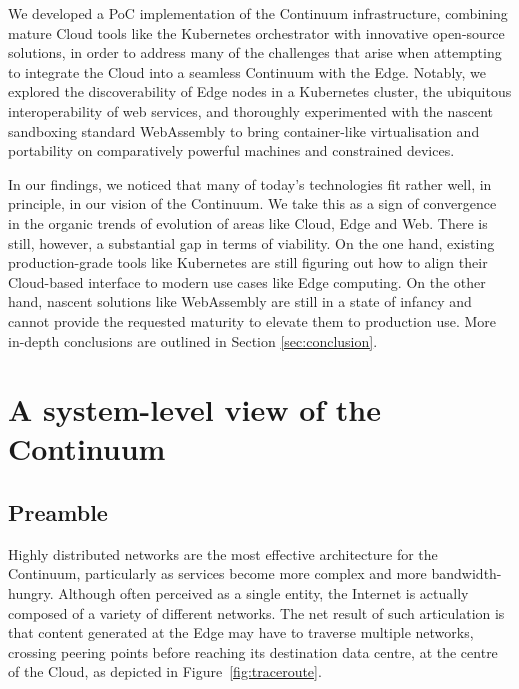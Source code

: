 We developed a PoC implementation of the Continuum infrastructure, combining mature Cloud tools like the Kubernetes \cite{kubernetes} orchestrator with innovative open-source solutions, in order to address many of the challenges that arise when attempting to integrate the Cloud into a seamless Continuum with the Edge. Notably, we explored the discoverability of Edge nodes in a Kubernetes cluster, the ubiquitous interoperability of web services, and thoroughly experimented with the nascent sandboxing standard WebAssembly \cite{haas2017bringing} to bring container-like virtualisation and portability on comparatively powerful machines and constrained devices.

In our findings, we noticed that many of today's technologies fit rather well, in principle, in our vision of the Continuum. We take this as a sign of convergence in the organic trends of evolution of areas like Cloud, Edge and Web. There is still, however, a substantial gap in terms of viability. On the one hand, existing production-grade tools like Kubernetes \cite{kubernetes} are still figuring out how to align their Cloud-based interface to modern use cases like Edge computing. On the other hand, nascent solutions like WebAssembly \cite{haas2017bringing} are still in a state of infancy and cannot provide the requested maturity to elevate them to production use. More in-depth conclusions are outlined in Section \ref{sec:conclusion}.


\section{A system-level view of the Continuum}
\label{sec:technicals}

\subsection{Preamble}
Highly distributed networks are the most effective architecture for the Continuum, particularly as services become more complex and more bandwidth-hungry. Although often perceived as a single entity, the Internet is actually composed of a variety of different networks. 
The net result of such articulation is that content generated at the Edge may have to traverse multiple networks, crossing peering points before reaching its destination data centre, at the centre of the Cloud, as depicted in Figure~\ref{fig:traceroute}.

